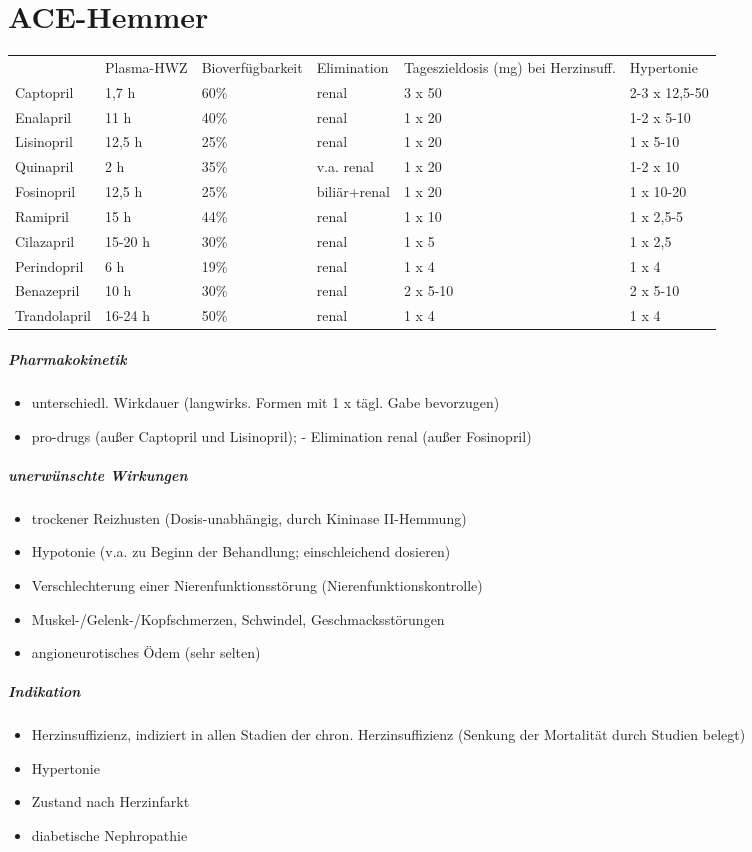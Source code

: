 \documentclass[10pt,a4paper]{report}
\begin{document}
\section{ACE-Hemmer}
\begin{tabularx}{\textwidth}{XXXXXX}
&Plasma-HWZ&Bioverfügbarkeit&Elimination&Tageszieldosis (mg) bei Herzinsuff.&Hypertonie\\
Captopril&1,7 h&60\%&renal&3 x 50&2-3 x 12,5-50\\
Enalapril&11 h&40\%&renal&1 x 20&1-2 x 5-10\\
Lisinopril&12,5 h&25\%&renal&1 x 20&1 x 5-10\\
Quinapril&2 h&35\%&v.a. renal&1 x 20&1-2 x 10\\
Fosinopril&12,5 h&25\%&biliär+renal&1 x 20&1 x 10-20\\
Ramipril&15 h&44\%&renal&1 x 10&1 x 2,5-5\\
Cilazapril&15-20 h&30\%&renal&1 x 5&1 x 2,5\\
Perindopril&6 h&19\%&renal&1 x 4&1 x 4\\
Benazepril&10 h&30\%&renal&2 x 5-10&2 x 5-10\\
Trandolapril&16-24 h&50\%&renal&1 x 4&1 x 4\\
\end{tabularx}
\subparagraph{Pharmakokinetik}
\begin{itemize}
	\item unterschiedl. Wirkdauer (langwirks. Formen mit 1 x tägl. Gabe bevorzugen)
	\item pro-drugs (außer Captopril und Lisinopril); - Elimination renal (außer Fosinopril)
\end{itemize}
\subparagraph{unerwünschte Wirkungen}
\begin{itemize}
	\item trockener Reizhusten (Dosis-unabhängig, durch Kininase II-Hemmung)
	\item Hypotonie (v.a. zu Beginn der Behandlung; einschleichend dosieren)
	\item Verschlechterung einer Nierenfunktionsstörung (Nierenfunktionskontrolle)
	\item Muskel-/Gelenk-/Kopfschmerzen, Schwindel, Geschmacksstörungen
	\item angioneurotisches Ödem (sehr selten)
\end{itemize}
\subparagraph{Indikation}
\begin{itemize}
	\item Herzinsuffizienz, indiziert in allen Stadien der chron. Herzinsuffizienz 
  (Senkung der Mortalität durch Studien belegt)
	\item Hypertonie
	\item Zustand nach Herzinfarkt
	\item diabetische Nephropathie
\end{itemize}
\end{document}
